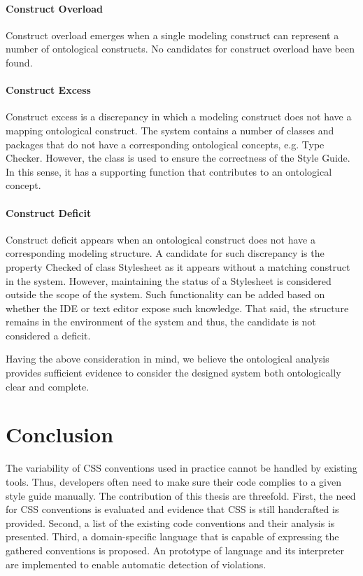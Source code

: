 \documentclass[parskip=full]{uvamscse}
\begin{document}
\subsubsection{Construct Overload}

Construct overload emerges when a single modeling construct can represent a number of ontological
constructs. No candidates for construct overload have been found.

\subsubsection{Construct Excess}

Construct excess is a discrepancy in which a modeling construct does not have a mapping ontological
construct. The system contains a number of classes and packages that do not have a corresponding
ontological concepts, e.g. Type Checker. However, the class is used to ensure the correctness of the
Style Guide. In this sense, it has a supporting function that contributes to an ontological concept.

\subsubsection{Construct Deficit}

Construct deficit appears when an ontological construct does not have a corresponding modeling
structure. A candidate for such discrepancy is the property Checked of class Stylesheet as it
appears without a matching construct in the system. However, maintaining the status of a Stylesheet
is considered outside the scope of the system. Such functionality can be added based on whether the
IDE or text editor expose such knowledge. That said, the structure remains in the environment of the
system and thus, the candidate is not considered a deficit.

Having the above consideration in mind, we believe the ontological analysis provides sufficient
evidence to consider the designed system both ontologically clear and complete.


\chapter{Conclusion}
\label{sec:conclusion}

The variability of CSS conventions used in practice cannot be handled by existing tools. Thus, developers often need to make sure their code complies to a given style guide manually. The contribution of this thesis are threefold. First, the need for CSS conventions is evaluated and
evidence that CSS is still handcrafted is provided. Second, a list of the existing code conventions
and their analysis is presented. Third, a domain-specific language that is capable of expressing the
gathered conventions is proposed. An prototype of language and its interpreter are implemented to
enable automatic detection of violations.

{%


}
\end{document}
